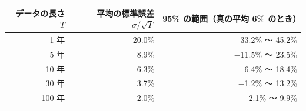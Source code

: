\begin{tabular}{rrr}
\toprule
データの長さ $T$ & 平均の標準誤差 $\sigma/\sqrt{T}$ & 95\% の範囲（真の平均 6\% のとき） \\
\midrule
1 年 & 20.0\% & \ensuremath{-}33.2\% 〜 45.2\% \\
5 年 & 8.9\% & \ensuremath{-}11.5\% 〜 23.5\% \\
10 年 & 6.3\% & \ensuremath{-}6.4\% 〜 18.4\% \\
30 年 & 3.7\% & \ensuremath{-}1.2\% 〜 13.2\% \\
100 年 & 2.0\% & 2.1\% 〜 9.9\% \\
\bottomrule
\end{tabular}
